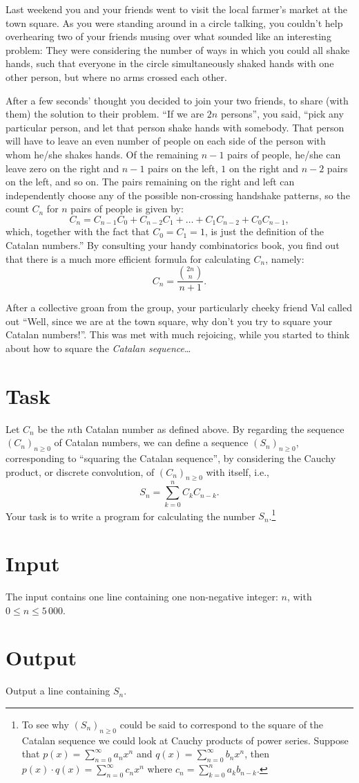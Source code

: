 

Last weekend you and your friends went to visit the local farmer's market at the town square. As you were standing around in a circle talking, you couldn't help overhearing two of your friends musing over what sounded like an interesting problem: They were considering the number of ways in which you could all shake hands, such that everyone in the circle simultaneously shaked hands with one other person, but where no arms crossed each other.

After a few seconds' thought you decided to join your two friends, to share (with them) the solution to their problem. ``If we are $2n$ persons'', you said, ``pick any particular person, and let that person shake hands with somebody. That person will have to leave an even number of people on each side of the person with whom he/she shakes hands. Of the remaining $n-1$ pairs of people, he/she can leave zero on the right and $n-1$ pairs on the left, $1$ on the right and $n-2$ pairs on the left, and so on. The pairs remaining on the right and left can independently choose any of the possible non-crossing handshake patterns, so the count $C_n$ for $n$ pairs of people is given by: $$C_n = C_{n-1}C_0 + C_{n-2}C_1 + \ldots + C_1C_{n-2} + C_0C_{n-1},$$ which, together with the fact that $C_0=C_1=1$, is just the definition of the Catalan numbers.'' By consulting your handy combinatorics book, you find out that there is a much more efficient formula for calculating $C_n$, namely: $$C_n = \frac{\binom{2n}{n}}{n+1}.$$

After a collective groan from the group, your particularly cheeky friend Val called out ``Well, since we are at the town square, why don't you try to square your Catalan numbers!''. This was met with much rejoicing, while you started to think about how to square the \emph{Catalan sequence}\ldots

\section*{Task}

Let $C_n$ be the $n$th Catalan number as defined above. By regarding the sequence $(C_n)_{n\geq 0}$ of Catalan numbers, we can define a sequence $(S_n)_{n\geq 0}$, corresponding to ``squaring the Catalan sequence'', by considering the Cauchy product, or discrete convolution, of $(C_n)_{n\geq 0}$ with itself, i.e., $$S_n = \sum_{k=0}^{n}C_kC_{n-k}.$$ Your task is to write a program for calculating the number $S_n$.\footnote{To see why $(S_n)_{n\geq 0}$ could be said to correspond to the square of the Catalan sequence we could look at Cauchy products of power series. Suppose that $p(x)=\sum_{n=0}^{\infty}a_nx^n$ and $q(x)=\sum_{n=0}^{\infty}b_nx^n$, then $p(x)\cdot q(x)=\sum_{n=0}^{\infty}c_nx^n$ where $c_n=\sum_{k=0}^{n}a_kb_{n-k}$.}

\section*{Input}

The input contains one line containing one non-negative integer: $n$, with $0 \leq n \leq 5\,000$.

\section*{Output}

Output a line containing $S_n$.
